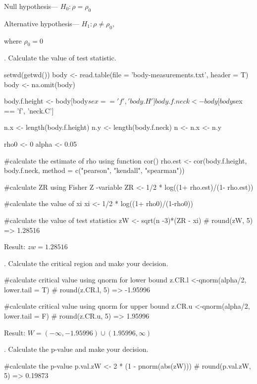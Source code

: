 \documentclass[12pt, oneside]{report}\usepackage[]{graphicx}\usepackage[]{color}
\begin{document}
Null hypothesis— $H_0 : \rho = \rho_0$ \newline

Alternative hypothesis— $H_1 : \rho \neq \rho_0$, \newline

where $\rho_0 = 0$\newline

. Calculate the value of test statistic.
\begin{Schunk}
\begin{Sinput}
setwd(getwd())
body <- read.table(file = 'body-measurements.txt', header = T)
body <- na.omit(body)

body.f.height <- body[body$sex == 'f', 'body.H']
body.f.neck <- body[body$sex == 'f', 'neck.C']

n.x <- length(body.f.height)
n.y <- length(body.f.neck)
n <- n.x <- n.y

rho0 <- 0
alpha <- 0.05

#calculate the estimate of rho using function cor()
rho.est <- cor(body.f.height, body.f.neck, method = c("pearson", "kendall", "spearman"))

#calculate ZR using Fisher Z -variable
ZR <- 1/2 * log((1+ rho.est)/(1- rho.est))

#calculate the value of xi
xi <- 1/2 * log((1+ rho0)/(1-rho0))

#calculate the value of test statistics
zW <- sqrt(n -3)*(ZR - xi)
# round(zW, 5) => 1.28516
\end{Sinput}
\end{Schunk}

Result: $zw = 1.28516$ \newline

. Calculate the critical region and make your decision.
\begin{Schunk}
\begin{Sinput}
#calculate critical value using qnorm for lower bound
z.CR.l <-qnorm(alpha/2, lower.tail = T)
# round(z.CR.l, 5) => -1.95996

#calculate critical value using qnorm for upper bound
z.CR.u <-qnorm(alpha/2, lower.tail = F)
# round(z.CR.u, 5) => 1.95996
\end{Sinput}
\end{Schunk}

Result: $W = (-\infty, -1.95996) \cup (1.95996, \infty) $ \newline

. Calculate the p-value and make your decision.
\begin{Schunk}
\begin{Sinput}
#calculate the p-value
p.val.zW <- 2 * (1 - pnorm(abs(zW)))
# round(p.val.zW, 5) => 0.19873
\end{Sinput}
\end{Schunk}
\end{document}
